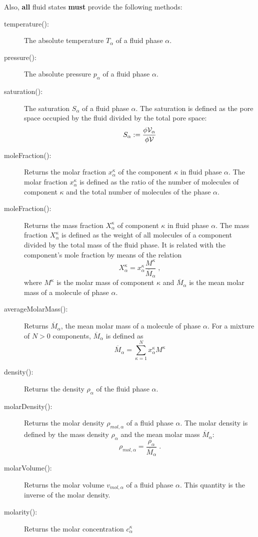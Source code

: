 Also, {\bf all} fluid states {\bf must} provide the following methods:
\begin{description}
\item[temperature():] The absolute temperature $T_\alpha$ of
  a fluid phase $\alpha$.
\item[pressure():] The absolute pressure $p_\alpha$ of a
  fluid phase $\alpha$.
\item[saturation():] The saturation $S_\alpha$ of a fluid phase
  $\alpha$. The saturation is defined as the pore space occupied by
  the fluid divided by the total pore space:
  \[
  S_\alpha := \frac{\phi \mathcal{V}_\alpha}{\phi \mathcal{V}}
  \]
\item[moleFraction():] Returns the molar fraction $x^\kappa_\alpha$ of
  the component $\kappa$ in fluid phase $\alpha$. The molar fraction
  $x^\kappa_\alpha$ is defined as the ratio of the number of molecules
  of component $\kappa$ and the total number of molecules of the phase
  $\alpha$.
\item[moleFraction():] Returns the mass fraction $X^\kappa_\alpha$ of
  component $\kappa$ in fluid phase $\alpha$. The mass fraction
  $X^\kappa_\alpha$ is defined as the weight of all molecules of a
  component divided by the total mass of the fluid phase. It is
  related with the component's mole fraction by means of the relation
  \[
  X^\kappa_\alpha = x^\kappa_\alpha \frac{M^\kappa}{\overline M_\alpha}\;,
  \]
  where $M^\kappa$ is the molar mass of component $\kappa$ and
  $\overline M_\alpha$ is the mean molar mass of a molecule of phase
  $\alpha$.
\item[averageMolarMass():] Returns $\overline M_\alpha$, the mean
  molar mass of a molecule of phase $\alpha$. For a mixture of $N > 0$
  components, $\overline M_\alpha$ is defined as
  \[
  \overline M_\alpha = \sum_{\kappa=1}^{N} x^\kappa_\alpha M^\kappa
  \]
\item[density():] Returns the density $\rho_\alpha$ of the fluid phase
  $\alpha$.
\item[molarDensity():] Returns the molar density $\rho_{mol,\alpha}$
  of a fluid phase $\alpha$. The molar density is defined by the mass
  density $\rho_\alpha$ and the mean molar mass $\overline M_\alpha$:
  \[
  \rho_{mol,\alpha} = \frac{\rho_\alpha}{\overline M_\alpha} \;.
  \]
\item[molarVolume():] Returns the molar volume $v_{mol,\alpha}$ of a
  fluid phase $\alpha$. This quantity is the inverse of the molar
  density.
\item[molarity():] Returns the molar concentration $c^\kappa_\alpha$

\end{description}
